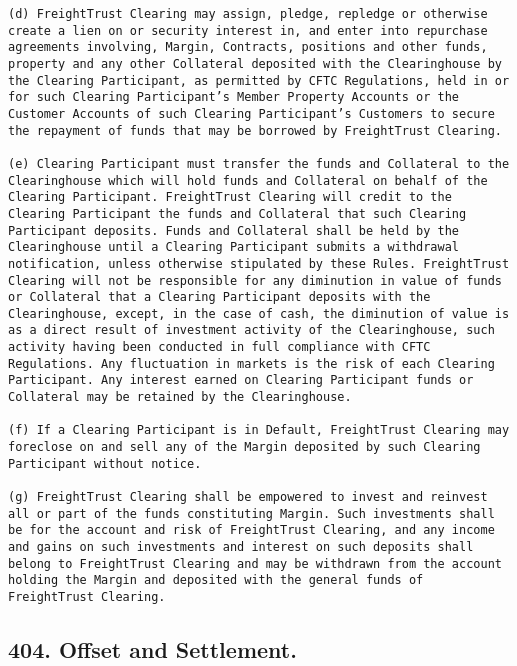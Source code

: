 \documentclass[12pt]{article}
\begin{document}
\begin{verbatim}
(d) FreightTrust Clearing may assign, pledge, repledge or otherwise create a lien on or security interest in, and enter into repurchase agreements involving, Margin, Contracts, positions and other funds, property and any other Collateral deposited with the Clearinghouse by the Clearing Participant, as permitted by CFTC Regulations, held in or for such Clearing Participant’s Member Property Accounts or the Customer Accounts of such Clearing Participant’s Customers to secure the repayment of funds that may be borrowed by FreightTrust Clearing.

(e) Clearing Participant must transfer the funds and Collateral to the Clearinghouse which will hold funds and Collateral on behalf of the Clearing Participant. FreightTrust Clearing will credit to the Clearing Participant the funds and Collateral that such Clearing Participant deposits. Funds and Collateral shall be held by the Clearinghouse until a Clearing Participant submits a withdrawal notification, unless otherwise stipulated by these Rules. FreightTrust Clearing will not be responsible for any diminution in value of funds or Collateral that a Clearing Participant deposits with the Clearinghouse, except, in the case of cash, the diminution of value is as a direct result of investment activity of the Clearinghouse, such activity having been conducted in full compliance with CFTC Regulations. Any fluctuation in markets is the risk of each Clearing Participant. Any interest earned on Clearing Participant funds or Collateral may be retained by the Clearinghouse.

(f) If a Clearing Participant is in Default, FreightTrust Clearing may foreclose on and sell any of the Margin deposited by such Clearing Participant without notice.

(g) FreightTrust Clearing shall be empowered to invest and reinvest all or part of the funds constituting Margin. Such investments shall be for the account and risk of FreightTrust Clearing, and any income and gains on such investments and interest on such deposits shall belong to FreightTrust Clearing and may be withdrawn from the account holding the Margin and deposited with the general funds of FreightTrust Clearing.
\end{verbatim}

\hypertarget{offset-and-settlement.}{%
\subsection{404. Offset and Settlement.}\label{offset-and-settlement.}}
\end{document}
